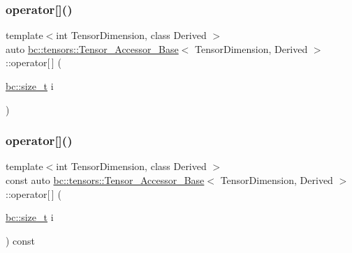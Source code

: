 \subsubsection{\texorpdfstring{operator[]()}{operator[]()}\hspace{0.1cm}{\footnotesize\ttfamily [1/6]}}
{\footnotesize\ttfamily template$<$int Tensor\+Dimension, class Derived $>$ \\
auto \hyperlink{classbc_1_1tensors_1_1Tensor__Accessor__Base}{bc\+::tensors\+::\+Tensor\+\_\+\+Accessor\+\_\+\+Base}$<$ Tensor\+Dimension, Derived $>$\+::operator\mbox{[}$\,$\mbox{]} (\begin{DoxyParamCaption}\item[{\hyperlink{namespacebc_aaf8e3fbf99b04b1b57c4f80c6f55d3c5}{bc\+::size\+\_\+t}}]{i }\end{DoxyParamCaption})\hspace{0.3cm}{\ttfamily [inline]}}

\mbox{\label{classbc_1_1tensors_1_1Tensor__Accessor__Base_a5a2b24905369aff2b093cd7dec9d4299}} 
\subsubsection{\texorpdfstring{operator[]()}{operator[]()}\hspace{0.1cm}{\footnotesize\ttfamily [2/6]}}
{\footnotesize\ttfamily template$<$int Tensor\+Dimension, class Derived $>$ \\
const auto \hyperlink{classbc_1_1tensors_1_1Tensor__Accessor__Base}{bc\+::tensors\+::\+Tensor\+\_\+\+Accessor\+\_\+\+Base}$<$ Tensor\+Dimension, Derived $>$\+::operator\mbox{[}$\,$\mbox{]} (\begin{DoxyParamCaption}\item[{\hyperlink{namespacebc_aaf8e3fbf99b04b1b57c4f80c6f55d3c5}{bc\+::size\+\_\+t}}]{i }\end{DoxyParamCaption}) const\hspace{0.3cm}{\ttfamily [inline]}}

\mbox{\label{classbc_1_1tensors_1_1Tensor__Accessor__Base_a9eb8b7a2c9e01bf7b2842cd8c6f039d3}} 
